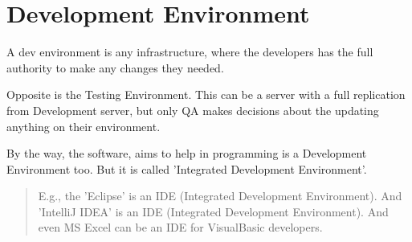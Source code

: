 \section{Development Environment}
\label{sec:Development Environment}

A dev environment is any infrastructure, where the developers has the full authority to make any changes they needed.

Opposite is the Testing Environment. This can be a server with a full replication from Development server, but only QA makes decisions about the updating anything on their environment.

By the way, the software, aims to help in programming is a Development Environment too. But it is called 'Integrated Development Environment'.

\begin{quote}
E.g., the 'Eclipse' is an IDE (Integrated Development Environment). And 'IntelliJ IDEA'  is an IDE (Integrated Development Environment). And even MS Excel can be an IDE for VisualBasic developers. 
\end{quote} 